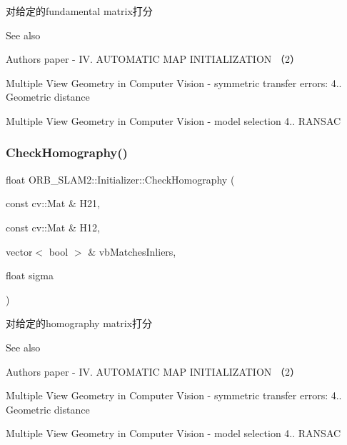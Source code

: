 对给定的fundamental matrix打分 

\begin{DoxySeeAlso}{See also}

\begin{DoxyItemize}
\item Author\textquotesingle{}s paper -\/ IV. A\+U\+T\+O\+M\+A\+T\+IC M\+AP I\+N\+I\+T\+I\+A\+L\+I\+Z\+A\+T\+I\+ON （2）
\item Multiple View Geometry in Computer Vision -\/ symmetric transfer errors\+: 4.. Geometric distance
\item Multiple View Geometry in Computer Vision -\/ model selection 4.. R\+A\+N\+S\+AC 
\end{DoxyItemize}
\end{DoxySeeAlso}
\mbox{\label{class_o_r_b___s_l_a_m2_1_1_initializer_ac2ac8374ca2a993b8cddc88703ffbe9a}} 
\subsubsection{\texorpdfstring{Check\+Homography()}{CheckHomography()}}
{\footnotesize\ttfamily float O\+R\+B\+\_\+\+S\+L\+A\+M2\+::\+Initializer\+::\+Check\+Homography (\begin{DoxyParamCaption}\item[{const cv\+::\+Mat \&}]{H21,  }\item[{const cv\+::\+Mat \&}]{H12,  }\item[{vector$<$ bool $>$ \&}]{vb\+Matches\+Inliers,  }\item[{float}]{sigma }\end{DoxyParamCaption})\hspace{0.3cm}{\ttfamily [private]}}



对给定的homography matrix打分 

\begin{DoxySeeAlso}{See also}

\begin{DoxyItemize}
\item Author\textquotesingle{}s paper -\/ IV. A\+U\+T\+O\+M\+A\+T\+IC M\+AP I\+N\+I\+T\+I\+A\+L\+I\+Z\+A\+T\+I\+ON （2）
\item Multiple View Geometry in Computer Vision -\/ symmetric transfer errors\+: 4.. Geometric distance
\item Multiple View Geometry in Computer Vision -\/ model selection 4.. R\+A\+N\+S\+AC 
\end{DoxyItemize}
\end{DoxySeeAlso}
\mbox{\label{class_o_r_b___s_l_a_m2_1_1_initializer_a72e79f6486468cde9abd87b873d840e7}} 
